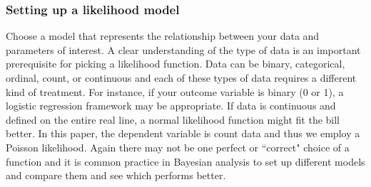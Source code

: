 \documentclass{article}
\begin{document}
\subsubsection{Setting up a likelihood model}
Choose a model that represents the relationship between your data and parameters of interest.  A clear understanding of the type of data is an important prerequisite for picking a likelihood function. Data can be binary, categorical, ordinal, count, or continuous and each of these types of data requires a different kind of treatment. For instance, if your outcome variable is binary (0 or 1), a logistic regression framework may be appropriate. If data is continuous and defined on the entire real line, a normal likelihood function might fit the bill better. In this paper, the dependent variable is count data and thus we employ a Poisson likelihood. Again there may not be one perfect or ``correct" choice of a function and it is common practice in Bayesian analysis to set up different models and compare them and see which performs better.
 
\end{document}
